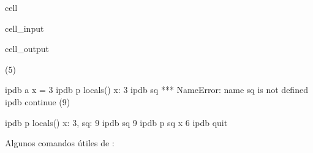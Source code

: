 \documentclass[letterpaper,10pt,english]{jupyterBook}
\begin{document}
\begin{sphinxuseclass}{cell}\begin{sphinxVerbatimInput}

\begin{sphinxuseclass}{cell_input}
\begin{sphinxVerbatim}[commandchars=\\\{\}]
\end{sphinxVerbatim}

\end{sphinxuseclass}\end{sphinxVerbatimInput}
\begin{sphinxVerbatimOutput}

\begin{sphinxuseclass}{cell_output}
\begin{sphinxVerbatim}[commandchars=\\\{\}]
\PYGZgt{} (5)

ipdb\PYGZgt{} a
x = 3
ipdb\PYGZgt{} p locals()
\PYGZob{}\PYGZsq{}x\PYGZsq{}: 3\PYGZcb{}
ipdb\PYGZgt{} sq
*** NameError: name \PYGZsq{}sq\PYGZsq{} is not defined
ipdb\PYGZgt{} continue
\PYGZgt{} (9)

ipdb\PYGZgt{} p locals()
\PYGZob{}\PYGZsq{}x\PYGZsq{}: 3, \PYGZsq{}sq\PYGZsq{}: 9\PYGZcb{}
ipdb\PYGZgt{} sq
9
ipdb\PYGZgt{} p sq \PYGZhy{} x
6
ipdb\PYGZgt{} quit
\end{sphinxVerbatim}

\end{sphinxuseclass}\end{sphinxVerbatimOutput}

\end{sphinxuseclass}
\sphinxAtStartPar
Algunos comandos útiles de :
\end{document}
